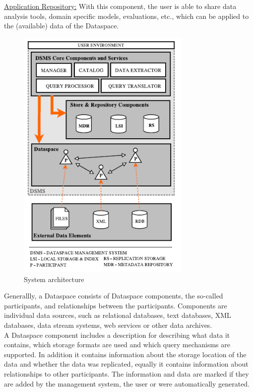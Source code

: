 \uline{Application Repository:} With this component, the user is able to share data analysis tools, domain specific models, evaluations, etc., which can be applied to the (available) data of the Dataspace.\\
\begin{figure}[H]
	\begin{center}
		\includegraphics[width=0.75\textwidth]{figures/TowardsRealizationOfDataspaces2.png}
	\end{center}
	\caption{System architecture}
	\label{TowardsRealizationOfDataspacesArchitecture}
\end{figure}
Generallly, a Dataspace consists of Dataspace components, the so-called participants, and relationships between the participants. Components are individual data sources, such as relational databases, text databases, XML databases, data stream systems, web services or other data archives.\\
A Dataspace component includes a description for describing what data it contains, which storage formats are used and which query mechanisms are supported. In addition it contains information about the storage location of the data and whether the data was replicated, equally it contains information about relationships to other participants. The information and data are marked if they are added by the management system, the user or were automatically generated.  \\
